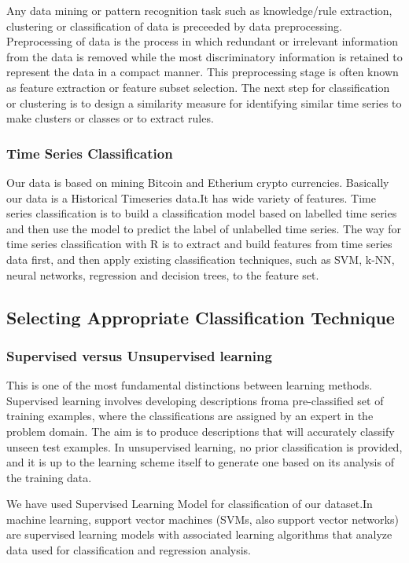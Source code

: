 \documentclass{article}
\begin{document}
Any data mining or pattern recognition task such as
knowledge/rule extraction, clustering or classification of data is preceeded by data preprocessing. Preprocessing of data is the process in which redundant or irrelevant information from the data is removed while the most discriminatory information is retained to represent the data in a compact manner. This preprocessing stage is often known as feature extraction or feature subset selection. The next step for classification
or clustering is to design a similarity measure for
identifying similar time series to make clusters or classes or to extract rules.

\subsubsection {Time Series Classification}
Our data is based on mining Bitcoin and Etherium crypto currencies. Basically our data is a Historical Timeseries data.It has wide variety of features.
Time series classification is to build a classification model based on labelled time series and then use the model to predict the label of unlabelled time series. The way for time series classification with R is to extract and build features from time series data first, and then apply existing classification techniques, such as SVM, k-NN, neural networks, regression and decision trees, to the feature set.

\subsection{Selecting Appropriate Classification
Technique }

\subsubsection {Supervised versus Unsupervised learning} This is one of the most fundamental distinctions between learning methods. Supervised learning involves developing descriptions froma pre-classified set of training examples, where the classifications are assigned by an expert in the problem domain. The aim is to produce descriptions that will accurately classify unseen test examples. In unsupervised learning, no prior classification is provided, and it is up to the learning scheme itself to generate one based on its analysis of the training data. \newline

We have used Supervised Learning Model for classification of our dataset.In machine learning, support vector machines (SVMs, also support vector networks) are supervised learning models with associated learning algorithms that analyze data used for classification and regression analysis. 
\end{document}
